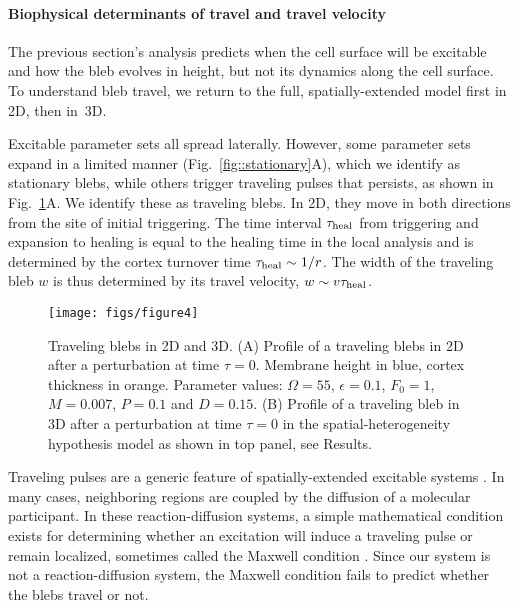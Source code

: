 \paragraph{Biophysical determinants of travel and travel velocity}

The previous section's analysis predicts when the cell surface will be excitable and how the bleb evolves in height, but not its dynamics along the cell surface. To understand bleb travel, we return to the full, spatially-extended model first in 2D, then in~3D. 

Excitable parameter sets all spread laterally. However, some parameter sets expand in a limited manner (Fig.~\ref{fig::stationary}A), which we identify as stationary blebs, while others trigger traveling pulses that persists, as shown in Fig.~\ref{fig::travel}A. We identify these as traveling blebs. In 2D, they move in both directions from the site of initial triggering. The time interval $\tau_{\mbox{\scriptsize heal}}$ from triggering and expansion to healing is equal to the healing time in the local analysis and is determined by the cortex turnover time $\tau_{\mbox{\scriptsize heal}} \sim 1/r$. The width of the traveling bleb $w$ is thus determined by its travel velocity, $w\sim v\tau_{\mbox{\scriptsize heal}}$. 

\begin{figure}
   \begin{center}
   \captionsetup{width=17cm}
     \texttt{[image: figs/figure4]}
      \caption{Traveling blebs in 2D and 3D. (A) Profile of a traveling blebs in 2D after a perturbation at time $\tau =0$. Membrane height in blue,  cortex thickness in orange. Parameter values: $\Omega = 55$, $\epsilon = 0.1$, $F_0 = 1$, $M = 0.007$, $P = 0.1$ and $D = 0.15$. (B) Profile of a traveling bleb in 3D after a perturbation at time $\tau =0$ in the spatial-heterogeneity hypothesis model as shown in top panel, see Results.}
      \label{fig::travel}
   \end{center}
\end{figure}

Traveling pulses are a generic feature of spatially-extended excitable systems \cite{Idema:2013ig, Ryan:2012bq, bement2015activator}. In many cases, neighboring regions are coupled by the diffusion of a molecular participant. In these reaction-diffusion systems, a simple mathematical condition exists for determining whether an excitation will induce a traveling pulse or remain localized, sometimes called the Maxwell condition \cite{Anonymous:OS1MPwCl,Mori:2008hj}. Since our system is not a reaction-diffusion system, the Maxwell condition fails to predict whether the blebs travel or not. 

